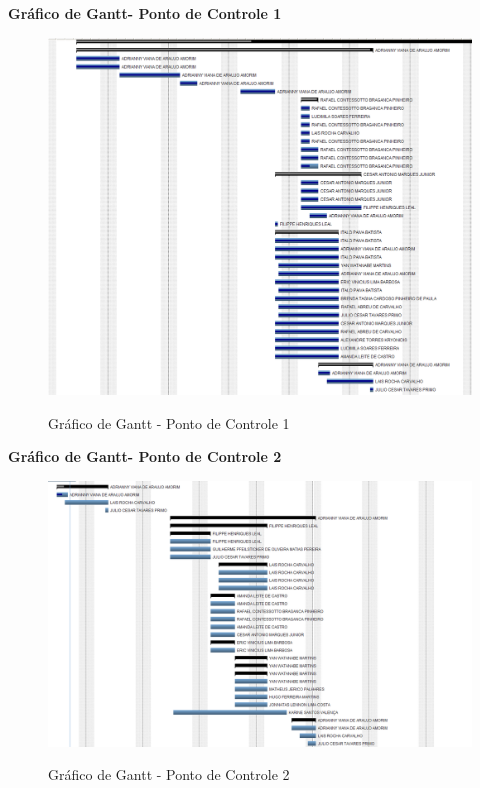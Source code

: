   \pagebreak
  \textbf{Gráfico de Gantt- Ponto de Controle 1}
   \begin{figure}[!h]
    \centering
    \includegraphics[scale = 0.45]{editaveis/figuras/ganttPC1}
    \label{Gráfico de Gantt PC 1}
    \caption{Gráfico de Gantt - Ponto de Controle 1}
   \end{figure}
   \FloatBarrier
   
  \pagebreak
  \textbf{Gráfico de Gantt- Ponto de Controle 2}
   \begin{figure}[!h]
    \centering
    \includegraphics[scale = 0.5]{editaveis/figuras/ganttPC2}
    \label{Gráfico de Gantt PC2}
    \caption{Gráfico de Gantt - Ponto de Controle 2}
   \end{figure}
   \FloatBarrier
   
